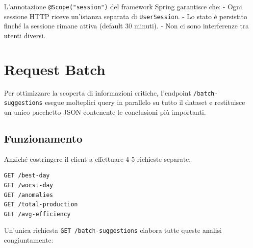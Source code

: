 \documentclass[a4paper,12pt]{report}
\begin{document}
L'annotazione \texttt{@Scope("session")} del framework Spring garantisce che:
- Ogni sessione HTTP riceve un'istanza separata di \texttt{UserSession}.
- Lo stato è persistito finché la sessione rimane attiva (default 30 minuti).
- Non ci sono interferenze tra utenti diversi.

\section{Request Batch}
Per ottimizzare la scoperta di informazioni critiche, l'endpoint \texttt{/batch-suggestions} esegue molteplici query in parallelo su tutto il dataset e restituisce un unico pacchetto JSON contenente le conclusioni più importanti.

\subsection{Funzionamento}
Anziché costringere il client a effettuare 4-5 richieste separate:
\begin{lstlisting}[language=bash]
GET /best-day
GET /worst-day
GET /anomalies
GET /total-production
GET /avg-efficiency
\end{lstlisting}

Un'unica richiesta \texttt{GET /batch-suggestions} elabora tutte queste analisi congiuntamente:
\end{document}
